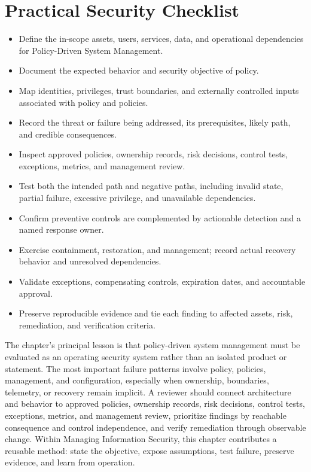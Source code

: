 \documentclass[11pt]{article}
\begin{document}
\section*{Practical Security Checklist}
\begin{itemize}[label=$\square$]
\item Define the in-scope assets, users, services, data, and operational dependencies for Policy-Driven System Management.
\item Document the expected behavior and security objective of policy.
\item Map identities, privileges, trust boundaries, and externally controlled inputs associated with policy and policies.
\item Record the threat or failure being addressed, its prerequisites, likely path, and credible consequences.
\item Inspect approved policies, ownership records, risk decisions, control tests, exceptions, metrics, and management review.
\item Test both the intended path and negative paths, including invalid state, partial failure, excessive privilege, and unavailable dependencies.
\item Confirm preventive controls are complemented by actionable detection and a named response owner.
\item Exercise containment, restoration, and management; record actual recovery behavior and unresolved dependencies.
\item Validate exceptions, compensating controls, expiration dates, and accountable approval.
\item Preserve reproducible evidence and tie each finding to affected assets, risk, remediation, and verification criteria.
\end{itemize}
\begin{synthesisbox}
The chapter's principal lesson is that policy-driven system management must be evaluated as an operating security system rather than an isolated product or statement. The most important failure patterns involve policy, policies, management, and configuration, especially when ownership, boundaries, telemetry, or recovery remain implicit. A reviewer should connect architecture and behavior to approved policies, ownership records, risk decisions, control tests, exceptions, metrics, and management review, prioritize findings by reachable consequence and control independence, and verify remediation through observable change. Within Managing Information Security, this chapter contributes a reusable method: state the objective, expose assumptions, test failure, preserve evidence, and learn from operation.
\end{synthesisbox}
\end{document}
